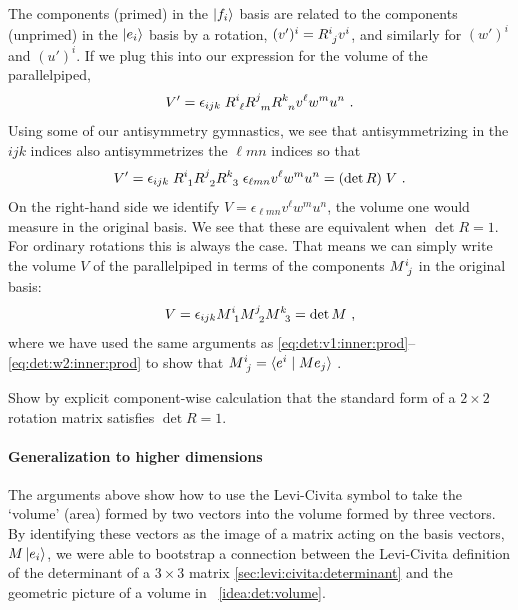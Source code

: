 \documentclass[12pt, oneside]{report}    %
\begin{document}
The components (primed) in the $\left|f_i\right\rangle$ basis are related to the components (unprimed) in the $\left|e_i\right\rangle$ basis by a rotation, $(v')^i=R\aij{i}{j}v^i$, and similarly for $(w')^i$ and $(u')^i$. If we plug this into our expression for the volume of the parallelpiped,
\begin{align}
    V' = \epsilon_{ijk}\; 
    R\aij{i}{\ell}
    R\aij{j}{m}
    R\aij{k}{n}
    v^\ell w^m u^n \ .
\end{align}
Using some of our antisymmetry gymnastics, we see that antisymmetrizing in the $ijk$ indices also antisymmetrizes the $\ell m n$ indices so that
\begin{align}
    V' = \epsilon_{ijk}\; 
    R\aij{i}{1}
    R\aij{j}{2}
    R\aij{k}{3}\;
    \epsilon_{\ell m n}
    v^\ell w^m u^n 
    =
    (\det R)\; V
    \ .
\end{align}
On the right-hand side we identify $V=\epsilon_{\ell m n} v^\ell w^m u^n $, the volume one would measure in the original basis. We see that these are equivalent when $\det R = 1$. For ordinary rotations this is always the case. That means we can simply write the volume $V$ of the parallelpiped in terms of the components $M\aij{i}{j}$ in the original basis:
\begin{align}
    V = \epsilon_{ijk}
    M\aij{i}{1}
    M\aij{j}{2}
    M\aij{k}{3}
    = \det M \ ,
\end{align}
where we have used the same arguments as \eqref{eq:det:v1:inner:prod}--\eqref{eq:det:w2:inner:prod} to show that $M\aij{i}{j} = \la e^i \mid M e_j \ra $ . 

\begin{exercise}
Show by explicit component-wise calculation that the standard form of a $2\times 2$ rotation matrix satisfies $\det R = 1$. 
\end{exercise}

\paragraph{Generalization to higher dimensions}

The arguments above show how to use the Levi-Civita symbol to take the `volume' (area) formed by two vectors into the volume formed by three vectors. By identifying these vectors as the image of a matrix acting on the basis vectors, $M\left|e_i\right\rangle$, we were able to bootstrap a connection between the Levi-Civita definition of the determinant of a $3\times 3$ matrix \eqref{sec:levi:civita:determinant} and the geometric picture of a volume in \bigidearef{}~\ref{idea:det:volume}.
\end{document}
